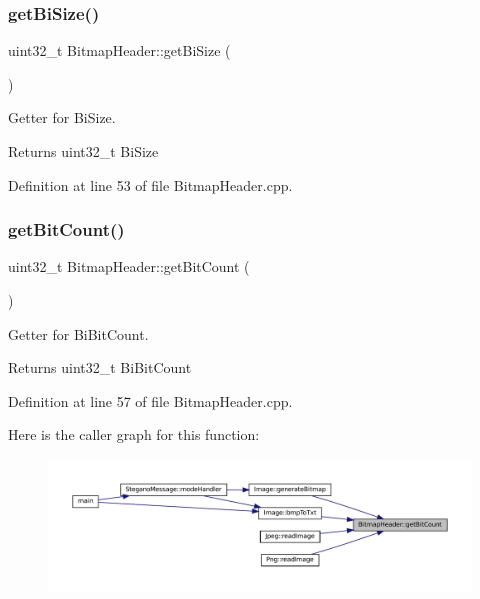 \subsubsection{\texorpdfstring{getBiSize()}{getBiSize()}}
{\footnotesize\ttfamily uint32\+\_\+t Bitmap\+Header\+::get\+Bi\+Size (\begin{DoxyParamCaption}{ }\end{DoxyParamCaption})}



Getter for Bi\+Size. 

\begin{DoxyReturn}{Returns}
uint32\+\_\+t Bi\+Size 
\end{DoxyReturn}


Definition at line 53 of file Bitmap\+Header.\+cpp.

\mbox{\label{classBitmapHeader_a2660782990f1d9547e0aef501f666969}} 
\subsubsection{\texorpdfstring{getBitCount()}{getBitCount()}}
{\footnotesize\ttfamily uint32\+\_\+t Bitmap\+Header\+::get\+Bit\+Count (\begin{DoxyParamCaption}{ }\end{DoxyParamCaption})}



Getter for Bi\+Bit\+Count. 

\begin{DoxyReturn}{Returns}
uint32\+\_\+t Bi\+Bit\+Count 
\end{DoxyReturn}


Definition at line 57 of file Bitmap\+Header.\+cpp.

Here is the caller graph for this function\+:\nopagebreak
\begin{figure}[H]
\begin{center}
\leavevmode
\includegraphics[width=350pt]{classBitmapHeader_a2660782990f1d9547e0aef501f666969_icgraph}
\end{center}
\end{figure}
\mbox{\label{classBitmapHeader_aa29e1acc8a7a588867039d7c0bdcde04}} 

